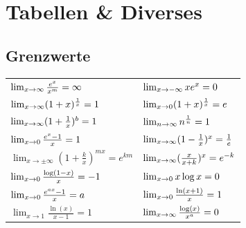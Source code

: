 \clearpage
\section{Tabellen \& Diverses}

\subsection{Grenzwerte}
\renewcommand*{\arraystretch}{2}
\begin{center}
	\begin{tabularx}{\linewidth}{XX}
		\toprule
		$\lim_{x\to\infty} \frac{e^x}{x^m} = \infty$                      & $\lim_{x\to-\infty} xe^x = 0$                        \\
		$\lim_{x\to\infty} (1+x)^{\frac{1}{x}} = 1$                       & $\lim_{x\to 0} (1+x)^{\frac{1}{x}} = e$         \\
		$\lim_{x\to\infty} (1+\frac{1}{x})^b = 1$                         & $\lim_{n\to \infty} n^{\frac{1}{n}} = 1$             \\
		$\lim_{x\to 0} \frac{e^x-1}{x} = 1$                           & $\lim_{x\to\infty} (1-\frac{1}{x})^x = \frac{1}{e}$ \\
		$\lim_{x\to\pm\infty} (1 + \frac{k}{x})^{mx} = e^{km}$ & $\lim_{x\to\infty} (\frac{x}{x+k})^x = e^{-k}$      \\
		$\lim_{x\to 0} \frac{\log(1 - x)}{x} = -1$                     & $\lim_{x\to 0} x \log x = 0$                    \\
		$\lim_{x\to 0} \frac{e^{ax}-1}{x} = a$                        & $\lim_{x\to 0} \frac{\ln(x+1)}{x} = 1$          \\
		$\lim_{x\to 1} \frac{\ln(x)}{x-1} = 1$                 & $\lim_{x\to\infty} \frac{\log(x)}{x^a} = 0$         \\
		\bottomrule
	\end{tabularx}
\end{center}

